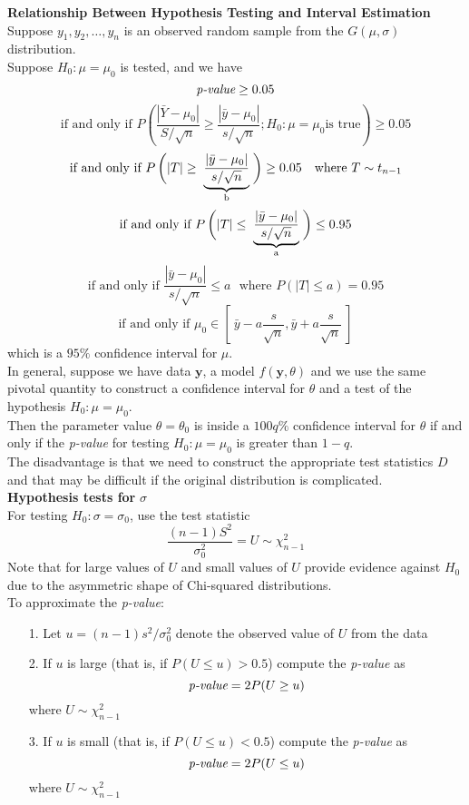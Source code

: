 \documentclass[12pt]{article}
\theoremstyle{definition}
\begin{document}
  \textbf{Relationship Between Hypothesis Testing and Interval Estimation} \\
  Suppose $y_1, y_2, \dots, y_n$ is an observed random sample from the $G(\mu, \sigma)$ distribution. \\
  Suppose $H_0 : \mu = \mu_0$ is tested, and we have
  $$\emph{p-value} \geq 0.05$$
  $$\text{if and only if } P\left(\frac{|\bar{Y} - \mu_0|}{S/\sqrt{n}} \geq \frac{|\bar{y} - \mu_0|}{s/\sqrt{n}}; H_0 : \mu = \mu_0 \text{is true}\right) \geq 0.05$$
  $$
  \text{if and only if } P\left(|T| \geq \vphantom{\frac{|\bar{y} - \mu_0|}{s/\sqrt{n}}}\right.
  \underbrace{\frac{|\bar{y} - \mu_0|}{s/\sqrt{n}}}_{\text{b}}
  \left.\vphantom{\frac{|\bar{y} - \mu_0|}{s/\sqrt{n}}}\right) \geq 0.05 ~~~\text{where } T \sim t_{n-1}
  $$
  $$
  \text{if and only if } P\left(|T| \leq \vphantom{\frac{|\bar{y} - \mu_0|}{s/\sqrt{n}}}\right.
  \underbrace{\frac{|\bar{y} - \mu_0|}{s/\sqrt{n}}}_{\text{a}}
  \left.\vphantom{\frac{|\bar{y} - \mu_0|}{s/\sqrt{n}}}\right) \leq 0.95
  $$
  $$\text{if and only if } \frac{|\bar{y} - \mu_0|}{s/\sqrt{n}} \leq a ~~~\text{where } P(|T| \leq a) = 0.95$$
  $$\text{if and only if } \mu_0 \in \left[~\bar{y} - a\frac{s}{\sqrt{n}}, \bar{y} + a\frac{s}{\sqrt{n}}~\right]$$
  which is a $95\%$ confidence interval for $\mu$. \\

  In general, suppose we have data $\textbf{y}$, a model $f(\textbf{y},\theta)$ and we use the same pivotal quantity to construct a confidence interval for $\theta$ and a test of the hypothesis $H_0 : \mu = \mu_0$. \\
  Then the parameter value $\theta = \theta_0$ is inside a $100q\%$ confidence interval for $\theta$ if and only if the \emph{p-value} for testing $H_0 : \mu = \mu_0$ is greater than $1 - q$. \\

  The disadvantage is that we need to construct the appropriate test statistics $D$ and that may be difficult if the original distribution is complicated. \\

  \textbf{Hypothesis tests for} $\sigma$ \\
  For testing $H_0 : \sigma = \sigma_0$, use the test statistic
  $$\frac{(n-1)S^{2}}{\sigma_{0}^{2}} = U \sim \chi_{n-1}^{2}$$
  Note that for large values of $U$ and small values of $U$ provide evidence against $H_0$ due to the asymmetric shape of Chi-squared distributions. \\
  To approximate the \emph{p-value}:
  \begin{itemize}
    \item[1.] Let $u = (n-1)s^{2}/\sigma_{0}^{2}$ denote the observed value of $U$ from the data
    \item[2.] If $u$ is large (that is, if $P(U \leq u) > 0.5$) compute the \emph{p-value} as
    $$\emph{p-value} = 2P(U \geq u)$$
    where $U \sim \chi^{2}_{n-1}$
    \item[3.] If $u$ is small (that is, if $P(U \leq u) < 0.5$) compute the \emph{p-value} as
    $$\emph{p-value} = 2P(U \leq u)$$
    where $U \sim \chi^{2}_{n-1}$
  \end{itemize}
\end{document}
